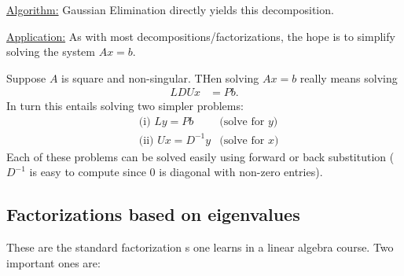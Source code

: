 \noindent \underline{Algorithm:} Gaussian Elimination directly yields this decomposition.

\medskip

\noindent \underline{Application:} As with most decompositions/factorizations, the hope is to simplify solving the system $Ax=b$. 

Suppose $A$ is square and non-singular. THen solving $Ax=b$ really means solving 
\begin{align*}
    LDUx &= Pb.
\end{align*}
In turn this entails solving two simpler problems: 
\begin{align*}
    &\text{(i) } Ly = Pb & \text{(solve for $y$)} \\
    &\text{(ii) } Ux = D^{-1}y & \text{(solve for $x$)}
\end{align*}
Each of these problems can be solved easily using forward or back substitution ($D^{-1}$ is easy to compute since $0$ is diagonal with non-zero entries).

\subsection{Factorizations based on eigenvalues}

These are the standard factorization s one learns in a linear algebra course. Two important ones are:

